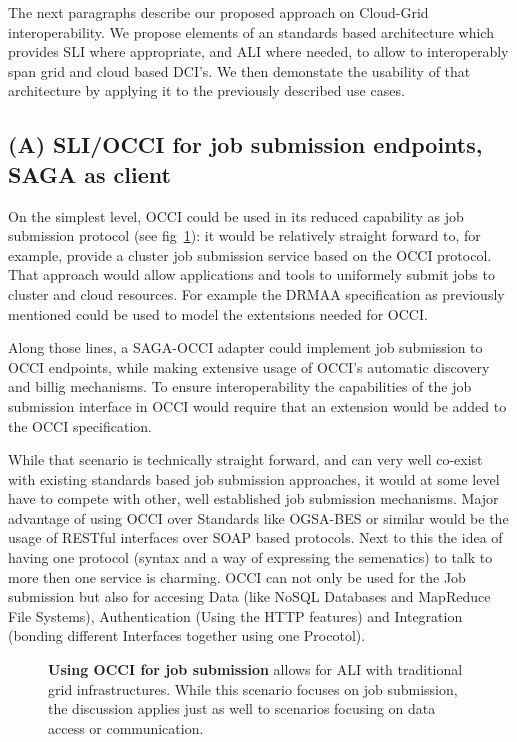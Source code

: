 \documentclass[10pt,conference,final,letterpaper,twoside,twocolumn,]{IEEEtran}
\newcommand{\B}[1]{\textbf{#1}}
\begin{document}
 The next paragraphs describe our proposed approach on Cloud-Grid
 interoperability. We propose elements of an standards based
 architecture which provides SLI where appropriate, and ALI where
 needed, to allow to interoperably span grid and cloud based DCI's.  We
 then demonstate the usability of that architecture by applying it to
 the previously described use cases.
 
 \subsection{(A) SLI/OCCI for job submission endpoints, SAGA as client}
 
 On the simplest level, OCCI could be used in its reduced capability as
 job submission protocol (see fig~\ref{fig:arch1}): it would be
 relatively straight forward to, for example, provide a cluster job
 submission service based on the OCCI protocol. That approach would
 allow applications and tools to uniformely submit jobs to cluster and
 cloud resources. For example the DRMAA specification as previously
 mentioned could be used to model the extentsions needed for OCCI.
 
 Along those lines, a SAGA-OCCI adapter could implement job submission
 to OCCI endpoints, while making extensive usage of OCCI's automatic
 discovery and billig mechanisms. To ensure interoperability the
 capabilities of the job submission interface in OCCI would require
 that an extension would be added to the OCCI specification.
 
 While that scenario is technically straight forward, and can very well
 co-exist with existing standards based job submission approaches, it
 would at some level have to compete with other, well established job
 submission mechanisms. Major advantage of using OCCI over Standards
 like OGSA-BES or similar would be the usage of RESTful interfaces over
 SOAP based protocols. Next to this the idea of having one protocol
 (syntax and a way of expressing the semenatics) to talk to more then
 one service is charming. OCCI can not only be used for the Job
 submission but also for accesing Data (like NoSQL Databases and
 MapReduce File Systems), Authentication (Using the HTTP features) and
 Integration (bonding different Interfaces together using one
 Procotol).
 
 \begin{figure}[htb]
  \caption{\footnotesize\label{fig:arch1} \B{Using OCCI for job 
     submission} allows for ALI with traditional grid infrastructures.  
     While this scenario focuses on job submission, the discussion 
     applies just as well to scenarios focusing on data access or 
     communication.}
 \end{figure}
 
\end{document}
